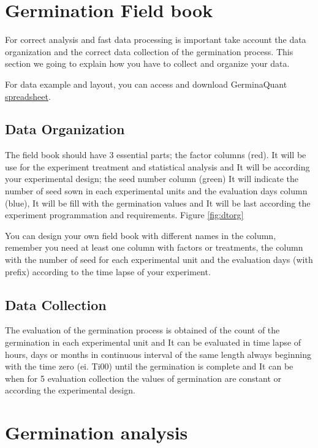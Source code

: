 \documentclass[]{book}
\begin{document}
\chapter{Germination Field book}\label{germination-field-book}

For correct analysis and fast data processing is important take account
the data organization and the correct data collection of the germination
process. This section we going to explain how you have to collect and
organize your data.

For data example and layout, you can access and download GerminaQuant
\href{https://docs.google.com/spreadsheets/d/1QziIXGOwb8cl3GaARJq6Ez6aU7vND_UHKJnFcAKx0VI/edit\#gid=667855537}{spreadsheet}.

\section{Data Organization}\label{data-organization}

The field book should have 3 essential parts; the factor columns (red).
It will be use for the experiment treatment and statistical analysis and
It will be according your experimental design; the seed number column
(green) It will indicate the number of seed sown in each experimental
units and the evaluation days column (blue), It will be fill with the
germination values and It will be last according the experiment
programmation and requirements. Figure \ref{fig:dtorg}

You can design your own field book with different names in the column,
remember you need at least one column with factors or treatments, the
column with the number of seed for each experimental unit and the
evaluation days (with prefix) according to the time lapse of your
experiment.

\section{Data Collection}\label{data-collection}

The evaluation of the germination process is obtained of the count of
the germination in each experimental unit and It can be evaluated in
time lapse of hours, days or months in continuous interval of the same
length always beginning with the time zero (ei. Ti00) until the
germination is complete and It can be when for 5 evaluation collection
the values of germination are constant or according the experimental
design.

\chapter{Germination analysis}\label{germination-analysis}
\end{document}
